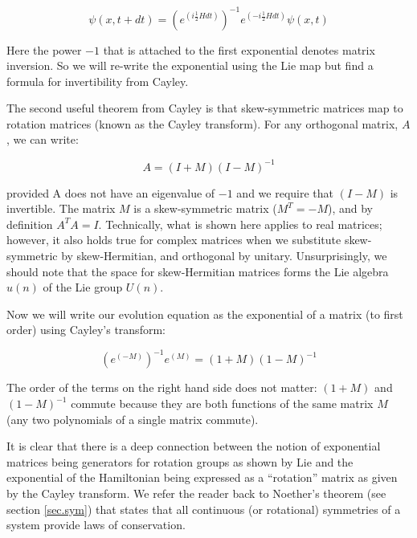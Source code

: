 \begin{equation}
\psi(x, t+dt) =  (e^{(i\frac{1}{2}Hdt)})^{-1} e^{(-i\frac{1}{2}Hdt)} \psi(x, t)
\end{equation}

\noindent Here the power $-1$ that is attached to the first exponential denotes matrix inversion. So we will re-write the exponential using the Lie map but find a formula for invertibility from Cayley.

The second useful theorem from Cayley is that skew-symmetric matrices map to rotation matrices (known as the Cayley transform). For any orthogonal matrix, $A$, we can write:

\begin{equation}
A = (I + M)(I - M)^{-1}
\end{equation}

\noindent provided A does not have an eigenvalue of $-1$ and we require that $(I - M)$ is invertible. The matrix $M$ is a skew-symmetric matrix ($M^T = -M$), and by definition $A^T A = I$. Technically, what is shown here applies to real matrices; however, it also holds true for complex matrices when we substitute skew-symmetric by skew-Hermitian, and orthogonal by unitary. Unsurprisingly, we should note that the space for skew-Hermitian matrices forms the Lie algebra $u(n)$ of the Lie group $U(n)$.

Now we will write our evolution equation as the exponential of a matrix (to first order) using Cayley's transform:

\begin{equation}
 (e^{(-M)})^{-1} e^{(M)} = (1 + M)(1 - M)^{-1}
\end{equation}

\noindent The order of the terms on the right hand side does not matter: $(1+M)$ and $(1-M)^{-1}$ commute because they are both functions of the same matrix $M$ (any two polynomials of a single matrix commute).


It is clear that there is a deep connection between the notion of exponential matrices being generators for rotation groups as shown by Lie and the exponential of the Hamiltonian being expressed as a ``rotation'' matrix as given by the Cayley transform. We refer the reader back to Noether's
theorem (see section \ref{sec.sym}) that states that all continuous (or rotational) symmetries of a system provide laws of conservation.

